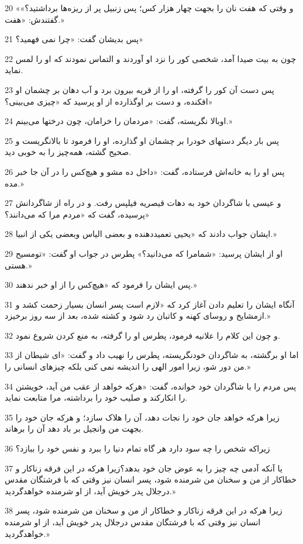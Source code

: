 \par 20 «و وقتی که هفت نان را بجهت چهار هزار کس؛ پس زنبیل پر از ریزه‌ها برداشتید؟» گفتندش: «هفت.»
\par 21 پس بدیشان گفت: «چرا نمی فهمید؟»
\par 22 چون به بیت صیدا آمد، شخصی کور را نزد او آوردند و التماس نمودند که او را لمس نماید.
\par 23 پس دست آن کور را گرفته، او را از قریه بیرون برد و آب دهان بر چشمان او افکنده، و دست بر اوگذارده از او پرسید که «چیزی می‌بینی؟»
\par 24 اوبالا نگریسته، گفت: «مردمان را خرامان، چون درختها می‌بینم.»
\par 25 پس بار دیگر دستهای خودرا بر چشمان او گذارده، او را فرمود تا بالانگریست و صحیح گشته، همه‌چیز را به خوبی دید.
\par 26 پس او را به خانه‌اش فرستاده، گفت: «داخل ده مشو و هیچ‌کس را در آن جا خبر مده.»
\par 27 و عیسی با شاگردان خود به دهات قیصریه فیلپس رفت. و در راه از شاگردانش پرسیده، گفت که «مردم مرا که می‌دانند؟»
\par 28 ایشان جواب دادند که «یحیی تعمید‌دهنده و بعضی الیاس وبعضی یکی از انبیا.»
\par 29 او از ایشان پرسید: «شمامرا که می‌دانید؟» پطرس در جواب او گفت: «تومسیح هستی.»
\par 30 پس ایشان را فرمود که «هیچ‌کس را از او خبر ندهند.»
\par 31 آنگاه ایشان را تعلیم دادن آغاز کرد که «لازم است پسر انسان بسیار زحمت کشد و ازمشایخ و روسای کهنه و کاتبان رد شود و کشته شده، بعد از سه روز برخیزد.»
\par 32 و چون این کلام را علانیه فرمود، پطرس او را گرفته، به منع کردن شروع نمود.
\par 33 اما او برگشته، به شاگردان خودنگریسته، پطرس را نهیب داد و گفت: «ای شیطان از من دور شو، زیرا امور الهی را اندیشه نمی کنی بلکه چیزهای انسانی را.»
\par 34 پس مردم را با شاگردان خود خوانده، گفت: «هر‌که خواهد از عقب من آید، خویشتن را انکارکند و صلیب خود را برداشته، مرا متابعت نماید.
\par 35 زیرا هر‌که خواهد جان خود را نجات دهد، آن را هلاک سازد؛ و هر‌که جان خود را بجهت من وانجیل بر باد دهد آن را برهاند.
\par 36 زیراکه شخص را چه سود دارد هر گاه تمام دنیا را ببرد و نفس خود را ببازد؟
\par 37 یا آنکه آدمی چه چیز را به عوض جان خود بدهد؟زیرا هر‌که در این فرقه زناکار و خطاکار از من و سخنان من شرمنده شود، پسر انسان نیز وقتی که با فرشتگان مقدس درجلال پدر خویش آید، از او شرمنده خواهدگردید.»
\par 38 زیرا هر‌که در این فرقه زناکار و خطاکار از من و سخنان من شرمنده شود، پسر انسان نیز وقتی که با فرشتگان مقدس درجلال پدر خویش آید، از او شرمنده خواهدگردید.»

